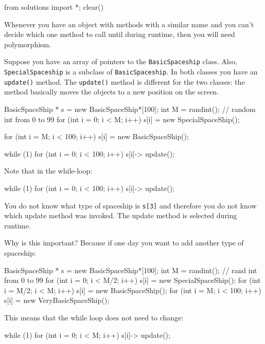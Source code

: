 \begin{python0}
from solutions import *; clear()
\end{python0}

Whenever you have an object with methods with a similar name and you can't decide which one method to call until during runtime, then you will need polymorphism.

Suppose you have an array of pointers to the \verb!BasicSpaceship! class.
Also, \verb!SpecialSpaceship! is a subclass of \verb!BasicSpaceship!. In both classes you have an \verb!update()! method. The \verb!update()! method is different for the two classes: the method basically moves the objects to a new position on the screen.

\begin{console}
BasicSpaceShip * s = new BasicSpaceShip*[100];
int M = randint(); // random int from 0 to 99
for (int i = 0; i < M; i++)
{   
    s[i] = new SpecialSpaceShip();
}

for (int i = M; i < 100; i++)
{   
    s[i] = new BasicSpaceShip();
}

while (1)
{   
    for (int i = 0; i < 100; i++)
    {   
        s[i]-> update();
    }
}
\end{console}

Note that in the while-loop:

\begin{console}
while (1)
{   
    for (int i = 0; i < 100; i++)
    {
        s[i]-> update();
    }
}
\end{console}

You do not know what type of spaceship is \verb!s[3]! and therefore you do not know which update method was invoked. The update method is selected during runtime.

Why is this important? Because if one day you want to add another type of spaceship:

\begin{console}
BasicSpaceShip * s = new BasicSpaceShip*[100];
int M = randint(); // rand int from 0 to 99
for (int i = 0; i < M/2; i++)
{   
    s[i] = new SpecialSpaceShip();
}
for (int i = M/2; i < M; i++)
{   
    s[i] = new BasicSpaceShip();
}
for (int i = M; i < 100; i++)
{   
    s[i] = new VeryBasicSpaceShip();
}
\end{console}

This means that the while loop does not need to change:

\begin{console}
while (1)
{   
    for (int i = 0; i < M; i++)
    {   
        s[i]-> update();
    }
}
\end{console}

